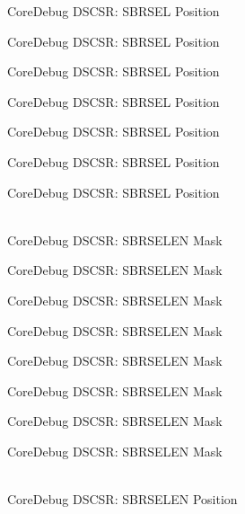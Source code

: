 \begin{DoxyRefList}
\label{deprecated__deprecated000149}%
%
Core\+Debug DSCSR:\+ SBRSEL Position 

\label{deprecated__deprecated000225}%
%
Core\+Debug DSCSR:\+ SBRSEL Position 

\label{deprecated__deprecated000288}%
%
Core\+Debug DSCSR:\+ SBRSEL Position 

\label{deprecated__deprecated000367}%
%
Core\+Debug DSCSR:\+ SBRSEL Position 

\label{deprecated__deprecated000443}%
%
Core\+Debug DSCSR:\+ SBRSEL Position 

\label{deprecated__deprecated000546}%
%
Core\+Debug DSCSR:\+ SBRSEL Position 

\label{deprecated__deprecated000648}%
%
Core\+Debug DSCSR:\+ SBRSEL Position  
\item[{\parbox[t]{\linewidth}{Global \doxylink{group__CMSIS__SCB_ga5e5ed94cac1139165af161c008881805}{Core\+Debug\+\_\+\+DSCSR\+\_\+\+SBRSELEN\+\_\+\+Msk} }}]\hfill \\
\label{deprecated__deprecated000098}%
%
Core\+Debug DSCSR:\+ SBRSELEN Mask 

\label{deprecated__deprecated000152}%
%
Core\+Debug DSCSR:\+ SBRSELEN Mask 

\label{deprecated__deprecated000228}%
%
Core\+Debug DSCSR:\+ SBRSELEN Mask 

\label{deprecated__deprecated000291}%
%
Core\+Debug DSCSR:\+ SBRSELEN Mask 

\label{deprecated__deprecated000370}%
%
Core\+Debug DSCSR:\+ SBRSELEN Mask 

\label{deprecated__deprecated000446}%
%
Core\+Debug DSCSR:\+ SBRSELEN Mask 

\label{deprecated__deprecated000549}%
%
Core\+Debug DSCSR:\+ SBRSELEN Mask 

\label{deprecated__deprecated000651}%
%
Core\+Debug DSCSR:\+ SBRSELEN Mask  
\item[{\parbox[t]{\linewidth}{Global \doxylink{group__CMSIS__SCB_ga3eb88e444b678057db1b59272eebb1ad}{Core\+Debug\+\_\+\+DSCSR\+\_\+\+SBRSELEN\+\_\+\+Pos} }}]\hfill \\
\label{deprecated__deprecated000097}%
%
Core\+Debug DSCSR:\+ SBRSELEN Position 


\end{DoxyRefList}
